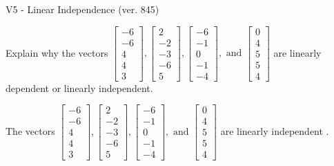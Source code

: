 \begin{exercise}
  \begin{exerciseTitle}V5 - Linear Independence (ver. 845)\end{exerciseTitle}
  \begin{exerciseStatement}
    Explain why the vectors \(\left[\begin{array}{r}
-6 \\
-6 \\
4 \\
4 \\
3
\end{array}\right] , \left[\begin{array}{r}
2 \\
-2 \\
-3 \\
-6 \\
5
\end{array}\right] , \left[\begin{array}{r}
-6 \\
-1 \\
0 \\
-1 \\
-4
\end{array}\right] , \text{ and } \left[\begin{array}{r}
0 \\
4 \\
5 \\
5 \\
4
\end{array}\right]\) are linearly dependent or linearly independent.	


  \end{exerciseStatement}
  \begin{exerciseAnswer}
   The vectors \(\left[\begin{array}{r}
-6 \\
-6 \\
4 \\
4 \\
3
\end{array}\right] , \left[\begin{array}{r}
2 \\
-2 \\
-3 \\
-6 \\
5
\end{array}\right] , \left[\begin{array}{r}
-6 \\
-1 \\
0 \\
-1 \\
-4
\end{array}\right] , \text{ and } \left[\begin{array}{r}
0 \\
4 \\
5 \\
5 \\
4
\end{array}\right]\) are 
  	 linearly independent  .
  


  \end{exerciseAnswer}
\end{exercise}